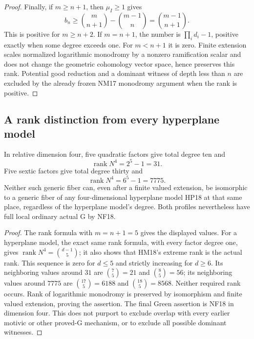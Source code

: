 \begin{proof}
Finally, if $m\ge n+1$, then $\mu_I\ge1$ gives
\[
 b_n\ge\binom m{n+1}-\binom{m-1}n
             =\binom{m-1}{n+1}.
\]
This is positive for $m\ge n+2$.  If $m=n+1$, the
number is $\prod_i d_i-1$, positive exactly when
some degree exceeds one.  For $m<n+1$ it is zero.
Finite extension scales normalized logarithmic monodromy
by a nonzero ramification scalar and does not change
the geometric cohomology vector space, hence preserves
this rank.  Potential good reduction and a dominant
witness of depth less than $n$ are excluded by the
already frozen NM17 monodromy argument when the rank
is positive.
\end{proof}

\subsection{A rank distinction from every hyperplane model}

\begin{corollary}
\label{r18ng:distinction}
In relative dimension four, five quadratic factors give
total degree ten and
\[
                  \operatorname{rank}N^4=2^5-1=31.
 \tag{NG18.4}\label{r18ng:quadrics}
\]
Five sextic factors give total degree thirty and
\[
                  \operatorname{rank}N^4=6^5-1=7775.
 \tag{NG18.5}\label{r18ng:sextics}
\]
Neither such generic fiber can, even after a finite valued
extension, be isomorphic to a generic fiber of any
four-dimensional hyperplane model HP18 at that same
place, regardless of the hyperplane model's degree.
Both profiles nevertheless have full local ordinary
actual G by NF18.
\end{corollary}

\begin{proof}
The rank formula with $m=n+1=5$ gives the displayed
values.  For a hyperplane model, the exact same rank
formula, with every factor degree one, gives
$\operatorname{rank}N^4=\binom{d-1}5$; it also shows
that HM18's extreme rank is the actual rank.
This sequence is zero for $d\le5$ and strictly increasing
for $d\ge6$.  Its neighboring values around $31$ are
$\binom75=21$ and $\binom85=56$; its neighboring
values around $7775$ are $\binom{17}5=6188$ and
$\binom{18}5=8568$.  Neither required rank occurs.
Rank of logarithmic monodromy is preserved by isomorphism
and finite valued extension, proving the assertion.
The final Green assertion is NF18 in dimension four.
This does not purport to exclude overlap with every
earlier motivic or other proved-G mechanism, or to
exclude all possible dominant witnesses.
\end{proof}

